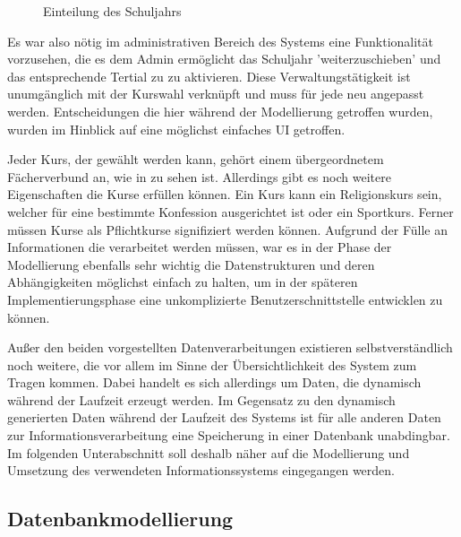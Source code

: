 \begin{figure}[h]
\begin{center}


\end{center}
\caption[\textbf{Einteilung des Schuljahrs}]{Einteilung des Schuljahrs}
\label{fig:Schuljahreinteilung}
\end{figure}

Es war also nötig im administrativen Bereich des Systems eine Funktionalität vorzusehen, die es dem Admin ermöglicht das Schuljahr 'weiterzuschieben' und das entsprechende Tertial zu zu aktivieren.
Diese Verwaltungstätigkeit ist unumgänglich mit der Kurswahl verknüpft und muss für jede neu angepasst werden. 
Entscheidungen die hier während der Modellierung getroffen wurden, wurden im Hinblick auf eine möglichst einfaches \ac{UI} getroffen.

Jeder Kurs, der gewählt werden kann, gehört einem übergeordnetem Fächerverbund an, wie in  zu sehen ist.
Allerdings gibt es noch weitere Eigenschaften die Kurse erfüllen können. Ein Kurs kann ein Religionskurs sein, welcher für eine bestimmte Konfession ausgerichtet ist oder ein Sportkurs.
Ferner müssen Kurse als Pflichtkurse signifiziert werden können.
Aufgrund der Fülle an Informationen die verarbeitet werden müssen, war es in der Phase der Modellierung ebenfalls sehr wichtig die Datenstrukturen und deren Abhängigkeiten möglichst einfach zu halten, um in der späteren Implementierungsphase eine unkomplizierte Benutzerschnittstelle entwicklen zu können. 

Außer den beiden vorgestellten Datenverarbeitungen existieren selbstverständlich noch weitere, die vor allem im Sinne der Übersichtlichkeit des System  zum Tragen kommen. 
Dabei handelt es sich allerdings um Daten, die dynamisch während der Laufzeit erzeugt werden.
Im Gegensatz zu den dynamisch generierten Daten während der Laufzeit des Systems ist für alle anderen Daten zur Informationsverarbeitung eine Speicherung in einer Datenbank unabdingbar.
Im folgenden Unterabschnitt soll deshalb näher auf die Modellierung und Umsetzung des verwendeten Informationssystems eingegangen werden.

\subsection{Datenbankmodellierung}\label{subsec:Datenbankmodellierung}


